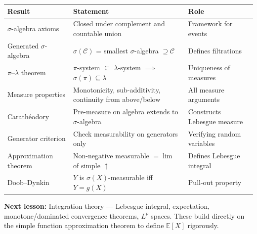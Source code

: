 \documentclass[11pt,a4paper]{article}
\theoremstyle{definition}
\theoremstyle{plain}
\theoremstyle{remark}
\newcommand{\E}{\mathbb{E}}
\begin{document}
\begin{center}
\renewcommand{\arraystretch}{1.4}
\begin{tabular}{p{4cm} p{5.5cm} p{4.5cm}}
\toprule
\textbf{Result} & \textbf{Statement} & \textbf{Role} \\
\midrule
$\sigma$-algebra axioms & Closed under complement and countable union & Framework for events \\
Generated $\sigma$-algebra & $\sigma(\mathcal{C})$ = smallest $\sigma$-algebra $\supseteq \mathcal{C}$ & Defines filtrations \\
$\pi$--$\lambda$ theorem & $\pi$-system $\subseteq$ $\lambda$-system $\implies$ $\sigma(\pi) \subseteq \lambda$ & Uniqueness of measures \\
Measure properties & Monotonicity, sub-additivity, continuity from above/below & All measure arguments \\
Carath\'{e}odory & Pre-measure on algebra extends to $\sigma$-algebra & Constructs Lebesgue measure \\
Generator criterion & Check measurability on generators only & Verifying random variables \\
Approximation theorem & Non-negative measurable $= \lim$ of simple $\uparrow$ & Defines Lebesgue integral \\
Doob--Dynkin & $Y$ is $\sigma(X)$-measurable iff $Y = g(X)$ & Pull-out property \\
\bottomrule
\end{tabular}
\end{center}

\medskip
\noindent\textbf{Next lesson:} Integration theory --- Lebesgue integral, expectation,
monotone/dominated convergence theorems, $L^p$ spaces. These build directly on the
simple function approximation theorem to define $\E[X]$ rigorously.
\end{document}
